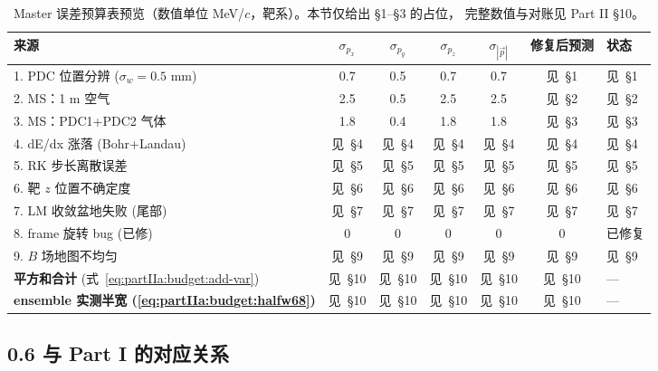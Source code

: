 \begin{table}[ht]
  \centering
  \small
  \begin{tabular}{l|cccc|c|l}
    \hline
    来源 & $\sigma_{p_x}$ & $\sigma_{p_y}$ & $\sigma_{p_z}$ & $\sigma_{|\vec p|}$ &
      修复后预测 & 状态 \\
    \hline
    1. PDC 位置分辨 ($\sigma_w{=}0.5$ mm)    & 0.7   & 0.5   & 0.7   & 0.7   & 见~§1  & 见~§1 \\
    2. MS：1 m 空气                          & 2.5   & 0.5   & 2.5   & 2.5   & 见~§2  & 见~§2 \\
    3. MS：PDC1+PDC2 气体                    & 1.8   & 0.4   & 1.8   & 1.8   & 见~§3  & 见~§3 \\
    4. dE/dx 涨落 (Bohr+Landau)              & 见~§4 & 见~§4 & 见~§4 & 见~§4 & 见~§4  & 见~§4 \\
    5. RK 步长离散误差                       & 见~§5 & 见~§5 & 见~§5 & 见~§5 & 见~§5  & 见~§5 \\
    6. 靶 $z$ 位置不确定度                   & 见~§6 & 见~§6 & 见~§6 & 见~§6 & 见~§6  & 见~§6 \\
    7. LM 收敛盆地失败 (尾部)                & 见~§7 & 见~§7 & 见~§7 & 见~§7 & 见~§7  & 见~§7 \\
    8. frame 旋转 bug (已修)                 & 0     & 0     & 0     & 0     & 0      & 已修复 \\
    9. $B$ 场地图不均匀                      & 见~§9 & 见~§9 & 见~§9 & 见~§9 & 见~§9  & 见~§9 \\
    \hline
    \textbf{平方和合计} (式~\ref{eq:partIIa:budget:add-var}) &
        见~§10 & 见~§10 & 见~§10 & 见~§10 & 见~§10 & --- \\
    \textbf{ensemble 实测半宽 (\ref{eq:partIIa:budget:halfw68})} &
        见~§10 & 见~§10 & 见~§10 & 见~§10 & 见~§10 & --- \\
    \hline
  \end{tabular}
  \caption{Master 误差预算表预览（数值单位 MeV/$c$，靶系）。本节仅给出 §1--§3 的占位，
    完整数值与对账见 Part II §10。}
  \label{tab:partIIa:budget:master-preview}
\end{table}


\subsection*{0.6 与 Part I 的对应关系}

